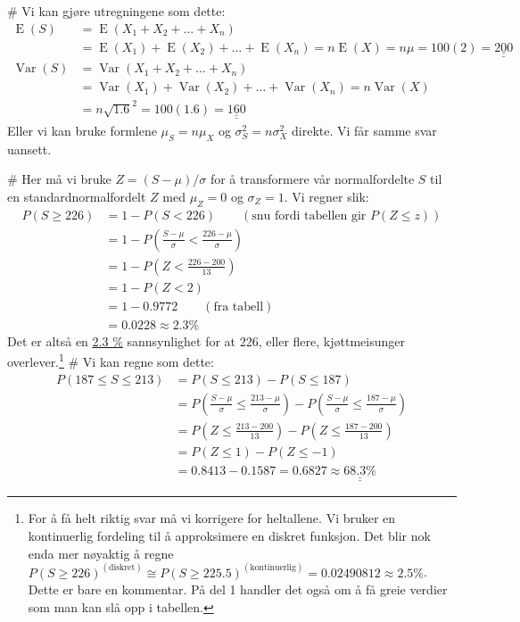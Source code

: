 \documentclass[12pt, a4paper]
{article}						%
\def\answer#1{\underline{\underline{#1}}}
\begin{document}
\begin{easylist}[enumerate]
	
	# Vi kan gjøre utregningene som dette:
	\begin{align*}
		\operatorname{E}(S) &= \operatorname{E}\left(X_1 + X_2 + \dots + X_n\right) \\
		&= \operatorname{E}(X_1) + \operatorname{E}(X_2) + \dots +  \operatorname{E}(X_n) = n \operatorname{E}(X) = n\mu = 100(2) = \answer{200} \\
		\operatorname{Var}(S) &= \operatorname{Var}\left(X_1 + X_2 + \dots + X_n\right) \\
		&= \operatorname{Var}(X_1) + \operatorname{Var}(X_2) + \dots +  \operatorname{Var}(X_n) = n \operatorname{Var}(X) \\ &= n \sqrt{1.6}^2 = 100(1.6) = \answer{160}
	\end{align*}
	Eller vi kan bruke formlene $\mu_S = n \mu_X$ og $\sigma_S^2 = n \sigma_X^2$ direkte.
	Vi får samme svar uansett.
	
	# Her må vi bruke $Z = (S-\mu)/\sigma$ for å transformere vår normalfordelte $S$
	til en standardnormalfordelt $Z$ med $\mu_Z = 0$ og $\sigma_Z = 1$. Vi regner slik:
	\begin{align*}
		P(S \geq 226) &= 1 - P(S < 226) \qquad (\text{snu fordi tabellen gir }P(Z \leq z)) \\
							&= 1 - P \left(\frac{S-\mu}{\sigma} < \frac{226-\mu}{\sigma}\right) \\
							&= 1 - P \left(Z < \frac{226-200}{13}\right) \\
							&= 1 - P \left(Z < 2\right) \\
							&= 1 - 0.9772  \qquad (\text{fra tabell})\\
							&= 0.0228 \approx 2.3 \%
	\end{align*}
	Det er altså en \answer{2.3 \%} sannsynlighet for at 226, eller flere, kjøttmeisunger overlever.\footnote{For å få helt riktig svar må vi korrigere for heltallene. Vi bruker en kontinuerlig fordeling til å approksimere en diskret funksjon. Det blir nok enda mer nøyaktig å regne $P(S \geq 226)^{(\text{diskret})} \cong P(S \geq 225.5)^{(\text{kontinuerlig})} = 0.02490812 \approx 2.5 \%$. Dette er bare en kommentar. På del 1 handler det også om å få greie verdier som man kan slå opp i tabellen.}
	# Vi kan regne som dette:
	\begin{align*}
		P(187 \leq S \leq 213) &= P(S \leq 213) - P(S \leq 187) \\
		&= P \left(\frac{S-\mu}{\sigma} \leq \frac{213-\mu}{\sigma}\right) - 
		P \left(\frac{S-\mu}{\sigma} \leq \frac{187-\mu}{\sigma}\right) \\
		&= P \left(Z \leq \frac{213-200}{13}\right) - 
		P \left(Z \leq \frac{187-200}{13}\right) \\
		&= P \left(Z \leq 1\right) - 
		P \left(Z \leq -1\right) \\
		&= 0.8413 - 
		0.1587 =  0.6827 \approx \answer{68.3\%}
	\end{align*}
\end{easylist}
\end{document}
